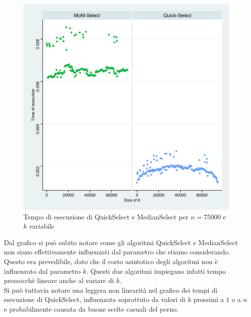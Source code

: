 \documentclass{article}
\begin{document}
	\begin{figure}[h!]
  		\includegraphics[width=\linewidth]{images/MoM_Quick_graph.png}
  		\caption{Tempo di esecuzione di QuickSelect e MedianSelect per $n=75000$ e $k$ variabile}
  		\label{fig:graph3}
	\end{figure}
	
	Dal grafico si può subito notare come gli algoritmi QuickSelect e MedianSelect non siano effettivamente influenzati dal parametro che stiamo considerando. Questo era prevedibile, dato che il costo asintotico degli algoritmi non è influenzato dal parametro $k$. Questi due algoritmi impiegano infatti tempo pressocchè lineare anche al variare di $k$. 
	\\
	Si può tuttavia notare una leggera non linearità nel grafico dei tempi di esecuzione di QuickSelect, influenzata soprattuto da valori di $k$ prossimi a $1$ o a $n$ e probabilmente causata da buone scelte casuali del perno.
	\newpage
	
\end{document}

